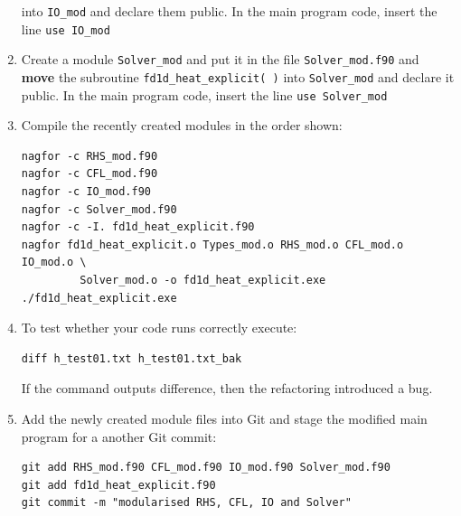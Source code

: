 \documentclass[12pt]{article}
\begin{document}
\begin{enumerate}
  into \texttt{IO\_mod} and declare them public. In the main program code, insert the line \texttt{use IO\_mod}
\item Create a module \texttt{Solver\_mod} and put it in the file \texttt{Solver\_mod.f90} and {\bf move} the
  subroutine \texttt{fd1d\_heat\_explicit( )} into \texttt{Solver\_mod} and declare it public. In the main
  program code, insert the line \texttt{use Solver\_mod}
\item Compile the recently created modules in the order shown:
\begin{verbatim}
nagfor -c RHS_mod.f90
nagfor -c CFL_mod.f90
nagfor -c IO_mod.f90
nagfor -c Solver_mod.f90
nagfor -c -I. fd1d_heat_explicit.f90
nagfor fd1d_heat_explicit.o Types_mod.o RHS_mod.o CFL_mod.o IO_mod.o \
         Solver_mod.o -o fd1d_heat_explicit.exe
./fd1d_heat_explicit.exe
\end{verbatim}
\item To test whether your code runs correctly execute:
\begin{verbatim}
diff h_test01.txt h_test01.txt_bak
\end{verbatim}
If the command outputs difference, then the refactoring introduced a bug.
\item Add the newly created module files into Git and stage the modified main program for a
another Git commit:
\begin{verbatim}
git add RHS_mod.f90 CFL_mod.f90 IO_mod.f90 Solver_mod.f90
git add fd1d_heat_explicit.f90
git commit -m "modularised RHS, CFL, IO and Solver"
\end{verbatim}
%
\end{enumerate}
\newpage
\end{document}
